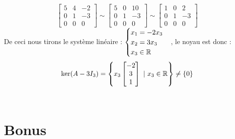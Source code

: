 \begin{exercice}
\begin{enumerate}
$$    \begin{bmatrix} 
    5 & 4 & -2 \\ 
    0 & 1 & -3 \\ 
    0 & 0 & 0 
    \end{bmatrix} \sim 
    \begin{bmatrix} 
    5 & 0 & 10 \\ 
    0 & 1 & -3 \\ 
    0 & 0 & 0 
    \end{bmatrix} \sim
    \begin{bmatrix} 
    1 & 0 & 2 \\ 
    0 & 1 & -3 \\ 
    0 & 0 & 0 
    \end{bmatrix}$$
    De ceci nous tirons le système linéaire :
    $\begin{cases}
    x_1 = -2x_3 \\
    x_2 = 3x_3\\
    x_3 \in \mathbb{R}
    \end{cases}$, le noyau est donc : $$\ker (A-3I_3) = \left\{ x_3\begin{bmatrix}
    -2 \\ 3 \\ 1
    \end{bmatrix} \ | \  x_3 \in \mathbb{R} \right\} \neq \{0\}$$\\
    \end{enumerate}
\end{exercice}

\section*{Bonus}

